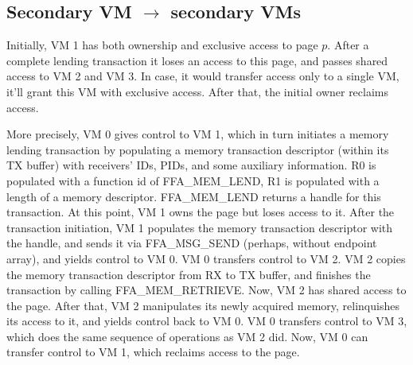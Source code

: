 \documentclass{article}
\begin{document}
\subsection{Secondary VM $\rightarrow$ secondary VMs}

Initially, VM 1 has both ownership and exclusive access to page $p$. After a complete lending transaction it loses an access to this page, and passes shared access to VM 2 and VM 3. In case, it would transfer access only to a single VM, it'll grant this VM with exclusive access. After that, the initial owner reclaims access.

More precisely, VM 0 gives control to VM 1, which in turn initiates a memory lending transaction by populating a memory transaction descriptor (within its TX buffer) with receivers' IDs, PIDs, and some auxiliary information. R0 is populated with a function id of FFA\_MEM\_LEND, R1 is populated with a length of a memory descriptor. FFA\_MEM\_LEND returns a handle for this transaction. At this point, VM 1 owns the page but loses access to it. After the transaction initiation, VM 1 populates the memory transaction descriptor with the handle, and sends it via FFA\_MSG\_SEND (perhaps, without endpoint array), and yields control to VM 0. VM 0 transfers control to VM 2. VM 2 copies the memory transaction descriptor from RX to TX buffer, and finishes the transaction by calling FFA\_MEM\_RETRIEVE. Now, VM 2 has shared access to the page. After that, VM 2 manipulates its newly acquired memory, relinquishes its access to it, and yields control back to VM 0. VM 0 transfers control to VM 3, which does the same sequence of operations as VM 2 did. Now, VM 0 can transfer control to VM 1, which reclaims access to the page.
\end{document}
